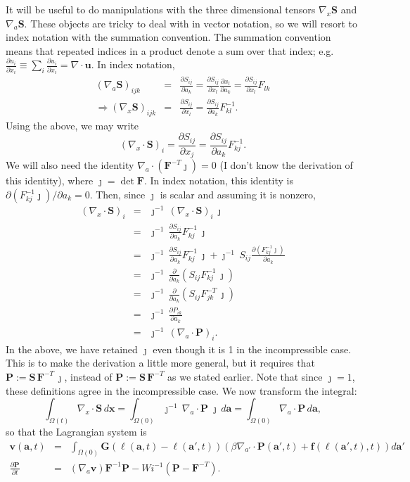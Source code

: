 \documentclass[12pt]{article}
\newcommand{\baa}[1]{\begin{eqnarray} #1 \end{eqnarray}}
\newcommand{\bees}[1]{\begin{equation*} #1 \end{equation*}}
\newcommand{\baas}[1]{\begin{eqnarray*} #1 \end{eqnarray*}}
\newcommand{\pd}[2]{\ensuremath{\frac{\partial #1}{\partial #2}}}
\newcommand{\bx}{{\mathbf x}}
\newcommand{\ba}{{\mathbf a}}
\newcommand{\bl}{{\pmb \ell}}
\newcommand{\bu}{{\mathbf u}}
\newcommand{\bv}{{\mathbf v}}
\newcommand{\ff}{{\mathbf f}}
\newcommand{\bS}{{\mathbf S}}
\newcommand{\bG}{{\mathbf G}}
\newcommand{\bF}{{\mathbf F}}
\newcommand{\bP}{{\mathbf P}}
\begin{document}
	It will be useful to do manipulations with the three dimensional tensors $\nabla_x \bS$ and $\nabla_a \bS$. These objects are tricky to deal with in vector notation, so we will resort to index notation with the summation convention. The summation convention means that repeated indices in a product denote a sum over that index; e.g. $\pd{u_i}{x_i} \equiv \sum_i \pd{u_i}{x_i} = \nabla \cdot \bu$. In index notation,
	\baas{
	(\nabla_a \bS)_{ijk} &=& \pd{S_{ij}}{a_k} = \pd{S_{ij}}{x_l}\pd{x_l}{a_k} = \pd{S_{ij}}{x_l}F_{lk} \\
	\Rightarrow (\nabla_x \bS)_{ijk} &=& \pd{S_{ij}}{x_l} = \pd{S_{ij}}{a_k}F^{-1}_{kl}.
	}
	Using the above, we may write 
	\bees{
	(\nabla_x \cdot \bS)_i = \pd{S_{ij}}{x_j} = \pd{S_{ij}}{a_k}F^{-1}_{kj}.
	}
	We will also need the identity $\nabla_a \cdot (\bF^{-T}\jmath) = 0$ (I don't know the derivation of this identity), where $\jmath = \det \bF$. In index notation, this identity is $\partial (F^{-1}_{kj} \jmath) /\partial a_k = 0$. Then, since $\jmath$ is scalar and assuming it is nonzero,
	\baas{
	(\nabla_x \cdot \bS)_i &=& \jmath^{-1} \,(\nabla_x \cdot \bS)_i \, \jmath \\
	&=& \jmath^{-1} \,\pd{S_{ij}}{a_k}F^{-1}_{kj} \,\jmath \\
	&=& \jmath^{-1}\, \pd{S_{ij}}{a_k}F^{-1}_{kj} \,\jmath + \jmath^{-1}\, S_{ij} \pd{(F^{-1}_{kj} \jmath)}{a_k} \\
	&=& \jmath^{-1}\, \pd{}{a_k}\left(S_{ij}F^{-1}_{kj} \,\jmath\right) \\
	&=& \jmath^{-1}\, \pd{}{a_k}\left(S_{ij}F^{-T}_{jk} \,\jmath\right) \\
	&=& \jmath^{-1}\,\pd{P_{ik}}{a_k}\\
	&=& \jmath^{-1}\,(\nabla_a \cdot \bP)_i.
	}
	In the above, we have retained $\jmath$ even though it is 1 in the incompressible case. This is to make the derivation a little more general, but it requires that $\bP := \bS\,\bF^{-T}\,\jmath$, instead of $\bP := \bS\,\bF^{-T}$ as we stated earlier. Note that since $\jmath = 1$, these definitions agree in the incompressible case. We now transform the integral:
	\bees{
	\int_{\Omega(t)} \nabla_x \cdot \bS \,d\bx = \int_{\Omega(0)} \jmath^{-1}\,\nabla_a \cdot \bP \;\jmath \,d\ba = \int_{\Omega(0)} \nabla_a \cdot \bP \, d\ba,
	}
	so that the Lagrangian system is 
	\baa{
	\bv(\ba,t) &=& \int_{\Omega(0)} \bG(\bl(\ba,t) - \bl(\ba',t)) \left( \beta \nabla_{a'} \cdot \bP(\ba',t) + \ff(\bl(\ba',t),t) \right) d\ba' \label{eqn:L1}\\
	\pd{\bP}{t} &=& \left(\nabla_a \bv \right)\bF^{-1}\bP - Wi^{-1}\left( \bP - \bF^{-T} \right) \nonumber. 
	}
	
\end{document}
